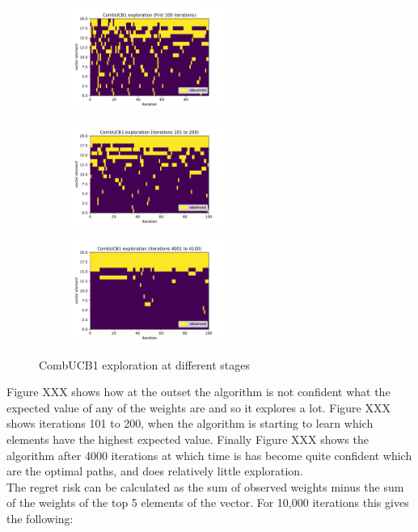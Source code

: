 \begin{figure}[h!]
\centering
\begin{subfigure}{.33\textwidth}
  \centering
  \includegraphics[width=50mm]{../plots/basicCombUCB1_100iters.pdf}
\end{subfigure}%
\begin{subfigure}{.33\textwidth}
  \centering
  \includegraphics[width=50mm]{../plots/basicCombUCB1_100_200iters.pdf}
\end{subfigure}
\begin{subfigure}{.33\textwidth}
  \centering
  \includegraphics[width=50mm]{../plots/basicCombUCB1_4000_4100iters.pdf}
\end{subfigure}
\caption{CombUCB1 exploration at different stages}
\label{fig:ullm-particle}
\end{figure}

Figure XXX shows how at the outset the algorithm is not confident what the expected value of any of the weights are and so it explores a lot. Figure XXX shows iterations 101 to 200, when the algorithm is starting to learn which elements have the highest expected value. Finally Figure XXX shows the algorithm after 4000 iterations at which time is has become quite confident which are the optimal paths, and does relatively little exploration.\\

The regret risk can be calculated as the sum of observed weights minus the sum of the weights of the top 5 elements of the vector. For 10,000 iterations this gives the following:\\

